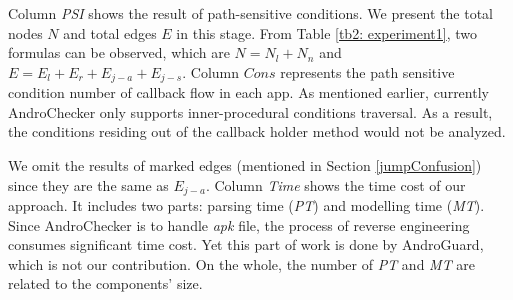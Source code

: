 %
Column \textit{PSI} shows the result of path-sensitive conditions. We present the total nodes $N$ and total edges $E$ in this stage. From Table \ref{tb2: experiment1}, two formulas can be observed, which are $N = N_{l} + N_{n}$ and $E = E_{l} + E_{r} + E_{j-a} + E_{j-s}$. Column $Cons$ represents the path sensitive condition number of callback flow in each app. As mentioned earlier, currently AndroChecker only supports inner-procedural conditions traversal. As a result, the conditions residing out of the callback holder method would not be analyzed. 

We omit the results of marked edges (mentioned in Section \ref{jumpConfusion}) since they are the same as $E_{j-a}$. Column \textit{Time} shows the time cost of our approach. It includes two parts: parsing time (\textit{PT}) and modelling time (\textit{MT}). Since AndroChecker is to handle \textit{apk} file, the process of reverse engineering consumes significant time cost. Yet this part of work is done by AndroGuard, which is not our contribution. On the whole, the number of \textit{PT} and \textit{MT} are related to the components' size. 

